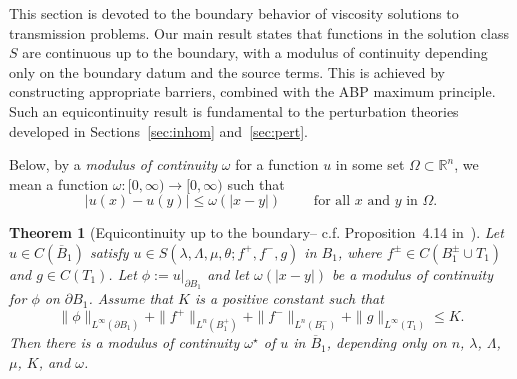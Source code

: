 \documentclass[letter,11pt]{amsart}
\newcommand{\R}{\mathbb{R}}
\newtheorem{thm}{Theorem}[section]
\theoremstyle{definition}
\numberwithin{equation}{section}
\begin{document}
This section is devoted to the boundary behavior of viscosity solutions to transmission problems.
Our main result states that functions in the solution class $S$ are continuous up to the boundary, with a modulus of continuity depending only on the boundary datum and the source terms.
This is achieved by constructing appropriate barriers, combined with the ABP maximum principle.
Such an equicontinuity result is fundamental to the perturbation theories developed in Sections~\ref{sec:inhom} and~\ref{sec:pert}. 

\medskip

Below, by a \emph{modulus of continuity} $\omega$ for a function $u$ in some set $\Omega \subset \R^n$, we mean a function $\omega \colon [0, \infty) \to [0, \infty)$ such that
\[
|u(x) - u(y)| \leq \omega(|x-y|) \qquad \text{ for all } x \text{ and } y \text{ in } \Omega.
\]

\begin{thm}
[Equicontinuity up to the boundary-- c.f. Proposition~4.14 in~\cite{CC}]
\label{thm:barriers}
Let $u \in C(\overline{B}_{1})$ satisfy $u \in S(\lambda, \Lambda, \mu, \theta; f^{+}, f^{-}, g)$ in $B_1$, where $f^{\pm} \in C(B_1^{\pm} \cup T_1)$ and $g \in C(T_1)$.
Let $\phi := u|_{\partial B_1}$ and let $\omega(|x-y|)$ be a modulus of continuity for $\phi$ on $\partial B_1$.
Assume that $K$ is a positive constant such that
\[
\|\phi\|_{L^{\infty}(\partial B_1)} + \|f^{+}\|_{L^{n}(B_1^{+})} + \|f^{-}\|_{L^{n}(B_1^{-})} + \|g\|_{L^{\infty}(T_1)} \leq K.
\]
Then there is a modulus of continuity $\omega^{\star}$ of $u$ in $\overline{B}_{1}$, depending only on $n$, $\lambda$, $\Lambda$, $\mu$, $K$, and $\omega$.
\end{thm}
\end{document}
